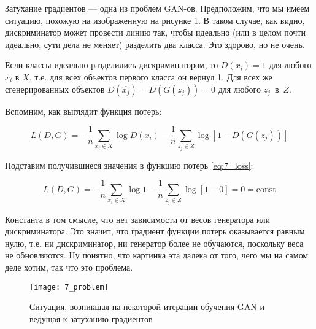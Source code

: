 Затухание градиентов --- одна из проблем GAN-ов. Предположим, что мы имеем ситуацию, похожую на изображенную на рисунке \ref{fig:7_problem}. В таком случае, как видно, дискриминатор может провести линию так, чтобы идеально (или в целом почти идеально, сути дела не меняет) разделить два класса. Это здорово, но не очень.

Если классы идеально разделились дискриминатором, то $D(x_i) = 1$ для любого $x_i$ в $X$, т.е. для всех объектов первого класса он вернул 1. Для всех же сгенерированных объектов $D(\hat{x_j}) = D(G(z_j)) = 0$ для любого $z_j$~в~$Z$.

Вспомним, как выглядит функция потерь:

\begin{equation}
	L(D, G) = - \frac{1}{n} \sum\limits_{x_i\in X}\log D(x_i) - \frac{1}{n} \sum\limits_{z_j\in Z}\log [1 - D(G(z_j))]
	\label{eq:7_loss}
\end{equation}

Подставим получившиеся значения в функцию потерь \ref{eq:7_loss}:

\begin{equation}
	L(D, G) = - \frac{1}{n} \sum\limits_{x_i\in X}\log 1 - \frac{1}{n} \sum\limits_{z_j\in Z}\log [1 - 0] = 0 = \text{const}
\end{equation}

Константа в том смысле, что нет зависимости от весов генератора или дискриминатора. Это значит, что градиент функции потерь оказывается равным нулю, т.е. ни дискриминатор, ни генератор более не обучаются, поскольку веса не обновляются. Ну понятно, что картинка эта далека от того, чего мы на самом деле хотим, так что это проблема.

\begin{figure}[H]
	\centering
	\texttt{[image: 7\_problem]}
	\caption{Ситуация, возникшая на некоторой итерации обучения GAN и ведущая к затуханию градиентов}
	\label{fig:7_problem}
\end{figure}